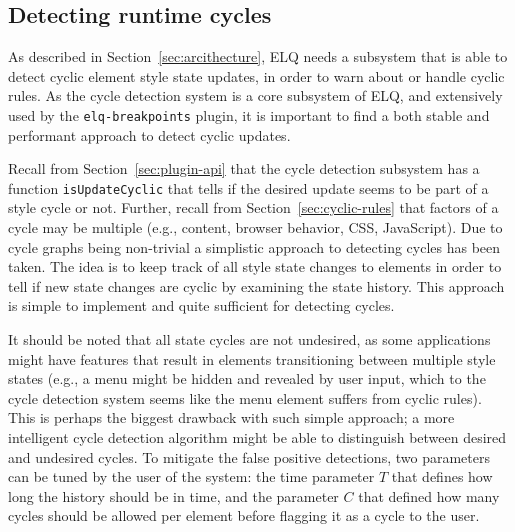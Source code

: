 \documentclass[a4paper,11pt]{kth-mag}
\newcommand{\code}[1]{\texttt{#1}}
\begin{document}
      \subsection{Detecting runtime cycles}\label{sec:imp_cycle_detector}
        As described in Section~\ref{sec:arcithecture}, \gls{ELQ} needs a subsystem that is able to detect cyclic element style state updates, in order to warn about or handle cyclic rules.
        As the cycle detection system is a core subsystem of \gls{ELQ}, and extensively used by the \code{elq-breakpoints} plugin, it is important to find a both stable and performant approach to detect cyclic updates.

        Recall from Section~\ref{sec:plugin-api} that the cycle detection subsystem has a function \code{isUpdateCyclic} that tells if the desired update seems to be part of a style cycle or not.
        Further, recall from Section~\ref{sec:cyclic-rules} that factors of a cycle may be multiple (e.g., content, \gls{browser} behavior, \gls{CSS}, \gls{JavaScript}).
        Due to cycle graphs being non-trivial a simplistic approach to detecting cycles has been taken.
        The idea is to keep track of all style state changes to \glspl{element} in order to tell if new state changes are cyclic by examining the state history.
        This approach is simple to implement and quite sufficient for detecting cycles.

        It should be noted that all state cycles are not undesired, as some applications might have features that result in \glspl{element} transitioning between multiple style states (e.g., a menu might be hidden and revealed by user input, which to the cycle detection system seems like the menu element suffers from cyclic rules).
        This is perhaps the biggest drawback with such simple approach; a more intelligent cycle detection algorithm might be able to distinguish between desired and undesired cycles.
        To mitigate the false positive detections, two parameters can be tuned by the user of the system: the time parameter $T$ that defines how long the history should be in time, and the parameter $C$ that defined how many cycles should be allowed per element before flagging it as a cycle to the user.
        
\end{document}
